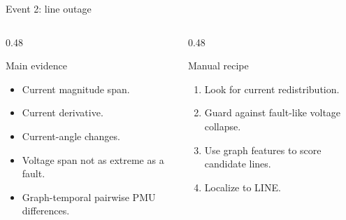﻿\documentclass[10pt,aspectratio=169]{beamer}
\begin{document}
\begin{frame}{Event 2: line outage}
\small
\begin{columns}[T,totalwidth=\textwidth]
\begin{column}{0.48\textwidth}
\begin{block}{Main evidence}
\begin{itemize}
  \item Current magnitude span.
  \item Current derivative.
  \item Current-angle changes.
  \item Voltage span not as extreme as a fault.
  \item Graph-temporal pairwise PMU differences.
\end{itemize}
\end{block}
\end{column}
\begin{column}{0.48\textwidth}
\begin{alertblock}{Manual recipe}
\begin{enumerate}
  \item Look for current redistribution.
  \item Guard against fault-like voltage collapse.
  \item Use graph features to score candidate lines.
  \item Localize to LINE.
\end{enumerate}
\end{alertblock}
\end{column}
\end{columns}
\end{frame}



\end{document}

